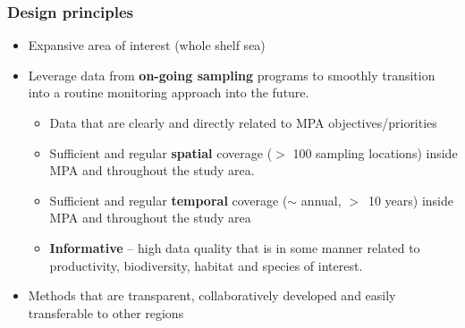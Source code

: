\documentclass{beamer}
\numberwithin{figure}{section}		%
\numberwithin{table}{section}				%
\begin{document}
\begin{frame}[shrink]
  \frametitle{Design principles}
  \begin{block}{}
  \begin{itemize}
    \item Expansive area of interest (whole shelf sea)
    \item Leverage data from \textbf{on-going sampling} programs to smoothly transition into a routine monitoring approach into the future.
    \begin{itemize}
      \item Data that are clearly and directly related to MPA objectives/priorities
      \item	Sufficient and regular \textbf{spatial} coverage ($>$ 100 sampling locations) inside MPA and throughout the study area.
      \item Sufficient and regular \textbf{temporal} coverage ($\sim$ annual, $>$~10 years) inside MPA and throughout the study area
      \item \textbf{Informative} -- high data quality that is in some manner related to productivity, biodiversity, habitat and species of interest.
    \end{itemize}
    \item Methods that are transparent, collaboratively developed and easily transferable to other regions

  \end{itemize}
  \end{block}
\end{frame}

\end{document}
